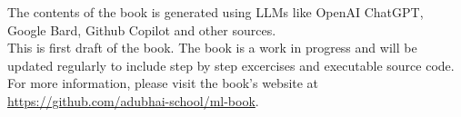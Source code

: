 The contents of the book is generated using LLMs like OpenAI ChatGPT, Google Bard, Github Copilot and other sources. \\

This is first draft of the book. The book is a work in progress and will be updated regularly to include step by step excercises and executable source code. \\

For more information, please visit the book's website at \url{https://github.com/adubhai-school/ml-book}.


